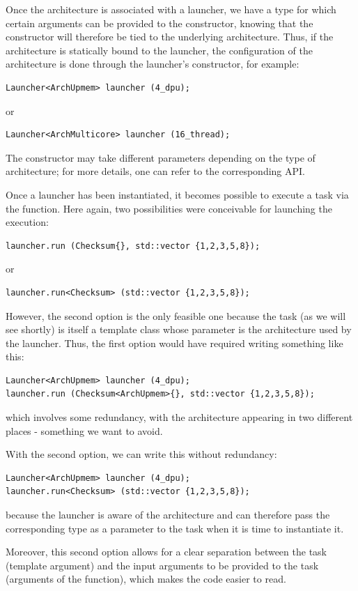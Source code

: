 Once the architecture is associated with a launcher, we have a type for which certain arguments can be provided to
 the constructor, knowing that the constructor will therefore be tied to the underlying architecture. 
 Thus, if the architecture is statically bound to the launcher, the configuration of the architecture is done through
  the launcher’s constructor, for example:
\begin{verbatim}
Launcher<ArchUpmem> launcher (4_dpu);
\end{verbatim}
or 
\begin{verbatim}
Launcher<ArchMulticore> launcher (16_thread);
\end{verbatim}
The constructor may take different parameters depending on the type of architecture; for more details, 
one can refer to the corresponding API.

Once a launcher has been instantiated, it becomes possible to execute a task via the  function. Here again, 
two possibilities were conceivable for launching the execution:
\begin{verbatim}
launcher.run (Checksum{}, std::vector {1,2,3,5,8});
\end{verbatim}
or
\begin{verbatim}
launcher.run<Checksum> (std::vector {1,2,3,5,8});
\end{verbatim}

However, the second option is the only feasible one because the task (as we will see shortly) is itself a template 
class whose parameter is the architecture used by the launcher. Thus, the first option would have required writing 
something like this:
\begin{verbatim}
Launcher<ArchUpmem> launcher (4_dpu);
launcher.run (Checksum<ArchUpmem>{}, std::vector {1,2,3,5,8});
\end{verbatim}
which involves some redundancy, with the architecture appearing in two different places - something we want to avoid.

With the second option, we can write this without redundancy:
\begin{verbatim}
Launcher<ArchUpmem> launcher (4_dpu);
launcher.run<Checksum> (std::vector {1,2,3,5,8});
\end{verbatim}
because the launcher is aware of the architecture and can therefore pass the corresponding type as a parameter to 
the task when it is time to instantiate it.

Moreover, this second option allows for a clear separation between the task (template argument) and the input arguments to be 
provided to the task (arguments of the  function), which makes the code easier to read.

